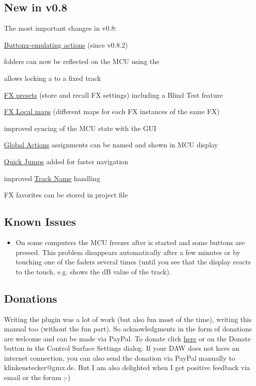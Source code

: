 \subsection{New in v0.8}

The most important changes in v0.8:
\begin{compactitem}
\item \hyperref[buttonactions]{Buttonx-emulating actions} (since v0.8.2)
\item \reaper folders can now be reflected on the MCU using the \foldermode
\item \anchors allows locking a \cs to a fixed track
\item \hyperref[fxpresets]{FX presets} (store and recall FX settings) including
a Blind Test feature
\item \hyperref[localmaps]{FX Local maps} (different maps for each FX
instances of the same FX)
\item improved syncing of the MCU state with the \reaper GUI
\item \hyperref[globalactions]{Global Actions} assignments can be named and
shown in MCU display
\item \hyperref[quickjump]{Quick Jumps} added for faster navigation  
\item improved \hyperref[tracknames]{Track Name} handling
\item FX favorites can be stored in \reaper project file
\end{compactitem}

\subsection{Known Issues}
\begin{itemize}
\item On some computers the MCU freezes after  \reaper is started and
  some buttons are pressed. This problem disappears automatically after
  a few minutes or by touching one of the faders several times (until you
  see that the display reacts to the touch, e.g. shows the dB
  value of the track).
\end{itemize}

\subsection{Donations}

Writing the plugin was a lot of work (but also fun most of the time), writing this
manual too (without the fun part). So acknowledgments in the form of donations are
welcome and can be made via PayPal. To donate click
\href{https://www.paypal.com/cgi-bin/webscr?cmd=_s-xclick&hosted_button_id=LR54GZHGL6VHA}{here}
or on the Donate button in the Control Surface
Settings dialog. If your DAW does not have an internet connection, you can also
send the donation via PayPal manually to klinkenstecker@gmx.de. But I am also
delighted when I get positive feedback via email or the \reaper forum ;-)


